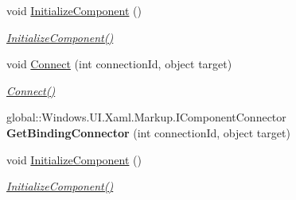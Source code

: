 \begin{DoxyCompactItemize}
void \hyperlink{class_i_v_s_calc_1_1_main_page_a82228985b36d2c45b809d7b2ba489aef}{Initialize\+Component} ()
\begin{DoxyCompactList}\small\item\em \hyperlink{class_i_v_s_calc_1_1_main_page_a82228985b36d2c45b809d7b2ba489aef}{Initialize\+Component()} \end{DoxyCompactList}\item 
void \hyperlink{class_i_v_s_calc_1_1_main_page_a36a7263a9c76a6fdfa392266c3b56122}{Connect} (int connection\+Id, object target)
\begin{DoxyCompactList}\small\item\em \hyperlink{class_i_v_s_calc_1_1_main_page_a36a7263a9c76a6fdfa392266c3b56122}{Connect()} \end{DoxyCompactList}\item 
\mbox{\label{class_i_v_s_calc_1_1_main_page_a1ed5d92cf49cffc51dd1dc959a933f7a}} 
global\+::\+Windows.\+U\+I.\+Xaml.\+Markup.\+I\+Component\+Connector {\bfseries Get\+Binding\+Connector} (int connection\+Id, object target)
\item 
void \hyperlink{class_i_v_s_calc_1_1_main_page_a82228985b36d2c45b809d7b2ba489aef}{Initialize\+Component} ()
\begin{DoxyCompactList}\small\item\em \hyperlink{class_i_v_s_calc_1_1_main_page_a82228985b36d2c45b809d7b2ba489aef}{Initialize\+Component()} \end{DoxyCompactList}\end{DoxyCompactItemize}
